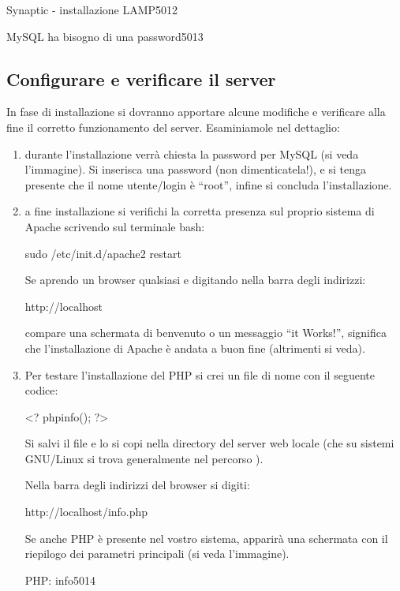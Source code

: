 \begin{img}{Synaptic - installazione LAMP}{5}{012}
\end{img}

\begin{img}{MySQL ha bisogno di una password}{5}{013}
\end{img}

\subsection{Configurare e verificare il server}
In fase di installazione si dovranno apportare alcune modifiche e verificare alla fine il corretto funzionamento del server. Esaminiamole nel dettaglio:

\begin{enumerate}
\item durante l'installazione verrà chiesta la password per MySQL (si veda l'immagine). Si inserisca una password (non dimenticatela!), e si tenga presente che il nome utente/login è ``root'', infine si concluda l'installazione.
\item a fine installazione si verifichi la corretta presenza sul proprio sistema di Apache scrivendo sul terminale bash:

\begin{code}
sudo /etc/init.d/apache2 restart
\end{code}

Se aprendo un browser qualsiasi e digitando nella barra degli indirizzi:

\begin{code}
http://localhost
\end{code}

compare una schermata di benvenuto o un messaggio ``it Works!'', significa che l'installazione di Apache è andata a buon fine (altrimenti si veda).

\item Per testare l'installazione del \ac{PHP} si crei un file di nome  con il seguente codice:

\begin{code}
<?
	phpinfo();
?>
\end{code}

Si salvi il file e lo si copi nella directory del server web locale (che su sistemi GNU/Linux si trova generalmente nel percorso ).

Nella barra degli indirizzi del browser si digiti:

\begin{code}
http://localhost/info.php
\end{code}

Se anche \ac{PHP} è presente nel vostro sistema, apparirà una schermata con il riepilogo dei parametri principali (si veda l'immagine).

\begin{img}{PHP: info}{5}{014}
\end{img}

\end{enumerate}

